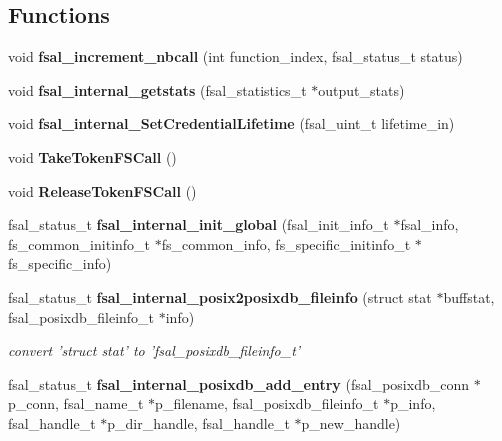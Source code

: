 \subsection*{Functions}
\begin{CompactItemize}
\item 
void {\bf fsal\_\-increment\_\-nbcall} (int function\_\-index, fsal\_\-status\_\-t status)
\item 
void {\bf fsal\_\-internal\_\-getstats} (fsal\_\-statistics\_\-t $\ast$output\_\-stats)
\item 
void {\bf fsal\_\-internal\_\-SetCredentialLifetime} (fsal\_\-uint\_\-t lifetime\_\-in)
\item 
void {\bf TakeTokenFSCall} ()
\item 
void \textbf{ReleaseTokenFSCall} ()\label{fsal__internal_8c_3ebf10f203cc6b718170d47f661b101a}

\item 
fsal\_\-status\_\-t \textbf{fsal\_\-internal\_\-init\_\-global} (fsal\_\-init\_\-info\_\-t $\ast$fsal\_\-info, fs\_\-common\_\-initinfo\_\-t $\ast$fs\_\-common\_\-info, fs\_\-specific\_\-initinfo\_\-t $\ast$fs\_\-specific\_\-info)\label{fsal__internal_8c_2ca38b8637e0751ef38dcc6ee67beb6f}

\item 
fsal\_\-status\_\-t {\bf fsal\_\-internal\_\-posix2posixdb\_\-fileinfo} (struct stat $\ast$buffstat, fsal\_\-posixdb\_\-fileinfo\_\-t $\ast$info)
\begin{CompactList}\small\item\em convert 'struct stat' to 'fsal\_\-posixdb\_\-fileinfo\_\-t' \item\end{CompactList}\item 
fsal\_\-status\_\-t \textbf{fsal\_\-internal\_\-posixdb\_\-add\_\-entry} (fsal\_\-posixdb\_\-conn $\ast$p\_\-conn, fsal\_\-name\_\-t $\ast$p\_\-filename, fsal\_\-posixdb\_\-fileinfo\_\-t $\ast$p\_\-info, fsal\_\-handle\_\-t $\ast$p\_\-dir\_\-handle, fsal\_\-handle\_\-t $\ast$p\_\-new\_\-handle)\label{fsal__internal_8c_11a9f034ee2ee509f83458d87b68dd2c}


\end{CompactItemize}
